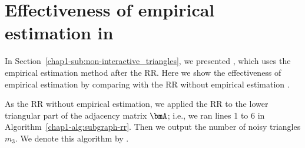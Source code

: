 \appendix




\section{Effectiveness of empirical estimation in }
\label{chap1-sec:RR_emp}
In Section~\ref{chap1-sub:non-interactive_triangles}, we presented , which uses the empirical estimation method after the RR. 
Here we show the effectiveness of empirical estimation by comparing  with the RR without empirical estimation \cite{Qin_CCS17,Ye_ICDE20}. 

As the RR without empirical estimation, we applied the RR to the lower triangular part of the adjacency matrix $\bmA$; i.e., we ran lines 1 to 6 in Algorithm~\ref{chap1-alg:subgraph-rr}. 
Then we output the number of noisy triangles $m_3$. 
We denote this algorithm by . 

